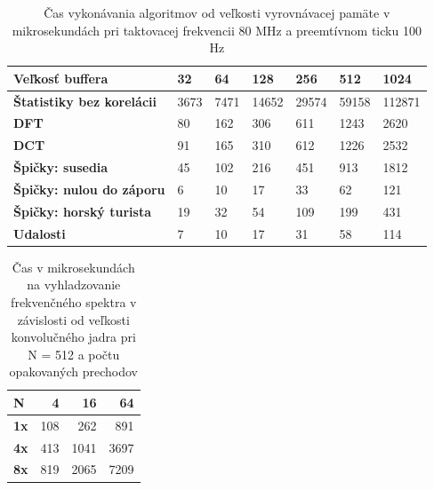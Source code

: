 \begin{table}[h]
\def\arraystretch{1.25}
\begin{tabular}{|l|l|l|l|l|l|l|}
\hline
\textbf{Veľkosť buffera}         & \textbf{32} & \textbf{64} & \textbf{128} & \textbf{256} & \textbf{512} & \textbf{1024} \\ \hline
\textbf{Štatistiky bez korelácii}& 3673        & 7471        & 14652        & 29574        & 59158        & 112871        \\ \hline
\textbf{DFT}                     & 80          & 162         & 306          & 611          & 1243         & 2620          \\ \hline
\textbf{DCT}                     & 91          & 165         & 310          & 612          & 1226         & 2532          \\ \hline
\textbf{Špičky: susedia}         & 45          & 102         & 216          & 451          & 913          & 1812          \\ \hline
\textbf{Špičky: nulou do záporu} & 6           & 10          & 17           & 33           & 62           & 121           \\ \hline
\textbf{Špičky: horský turista}  & 19          & 32          & 54           & 109          & 199          & 431           \\ \hline
\textbf{Udalosti}                & 7           & 10          & 17           & 31           & 58           & 114           \\ \hline
\end{tabular}
\caption{Čas vykonávania algoritmov od veľkosti vyrovnávacej pamäte v mikrosekundách pri taktovacej frekvencii 80 MHz a preemtívnom
ticku 100 Hz}
\end{table}

\begin{table}[h]
\def\arraystretch{1.25}
\centering
\begin{tabular}{|l|r|r|r|}
\hline
\textbf{N}  & \textbf{4} & \textbf{16} & \textbf{64} \\ \hline
\textbf{1x} & 108        & 262         & 891         \\ \hline
\textbf{4x} & 413        & 1041        & 3697        \\ \hline
\textbf{8x} & 819        & 2065        & 7209        \\ \hline
\end{tabular}
\caption{Čas v mikrosekundách na vyhladzovanie frekvenčného spektra v závislosti od veľkosti konvolučného jadra pri N = 512 a počtu opakovaných prechodov}
\end{table}


